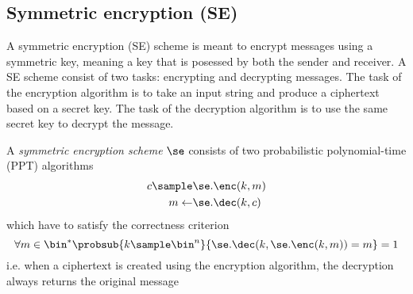 \newpage
\subsection{Symmetric encryption (SE)}\label{ssec:enc-definition}\label{ssec:SE}
A symmetric encryption (SE) scheme is meant to encrypt messages using a symmetric key, meaning a key that is posessed by both the sender and receiver. A SE scheme consist of two tasks: encrypting and decrypting messages. The task of the encryption algorithm is to take an input string and produce a ciphertext based on a secret key. The task of the decryption algorithm is to use the same secret key to decrypt the message.

\begin{syntax}
	A \emph{symmetric encryption scheme} $\se$ consists of two probabilistic polynomial-time (PPT) algorithms
	\begin{align*}
		c \sample & \se.\enc(k,m) \\
		m\gets    & \se.\dec(k,c)
	\end{align*}
	which have to satisfy the correctness criterion
	\[\forall m\in\bin^* \probsub{k\sample\bin^n}{\se.\dec(k,\se.\enc(k,m))=m}=1\]
	i.e. when a ciphertext is created using the encryption algorithm, the decryption always returns the original message
\end{syntax}

